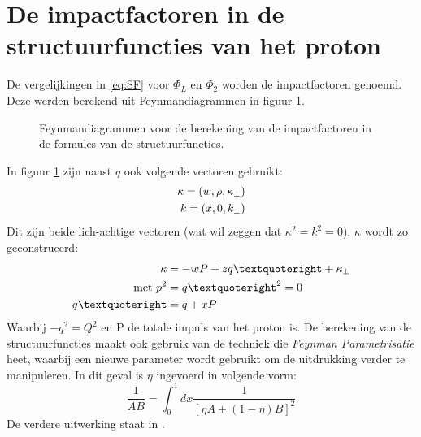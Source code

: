 \documentclass[a4paper,11pt]{article}
\numberwithin{equation}{section} %
\begin{document}
\section{De impactfactoren in de structuurfuncties van het proton} \label{app:ImpactFactors}
De vergelijkingen in \eqref{eq:SF} voor $\Phi_L$ en $\Phi_2$ worden de impactfactoren genoemd.
Deze werden berekend uit Feynmandiagrammen in figuur \ref{fig:FeynmanImpactFactors}.
\begin{figure} [H]
\centering
{}
\caption{Feynmandiagrammen voor de berekening van de impactfactoren in de formules van de structuurfuncties.}
\label{fig:FeynmanImpactFactors}
\end{figure}
In figuur \ref{fig:FeynmanImpactFactors} zijn naast $q$ ook volgende vectoren gebruikt:
\begin{align}
\kappa = (w, \rho, \kappa_\perp) \notag \\
k = (x,0,k_\perp) \notag
\end{align}
Dit zijn beide lich-achtige vectoren (wat wil zeggen dat $\kappa^2 = k^2 = 0$).
$\kappa$ wordt zo geconstrueerd:
\begin{align}
\kappa &= -wP + z q’ + \kappa_\perp \\
\text{met } p^2 &= q’^2 = 0 \notag \\
q’ &= q + xP
\end{align}
Waarbij $-q^2 = Q^2$ en P de totale impuls van het proton is.
De berekening van de structuurfuncties maakt ook gebruik van de techniek die \textit{Feynman Parametrisatie} heet, waarbij een nieuwe parameter wordt gebruikt om de uitdrukking verder te manipuleren.
In dit geval is $\eta$ ingevoerd in volgende vorm:
\begin{equation}
\frac{1}{AB} = \int_0^1 dx \frac{1}{\left[\eta A+(1-\eta)B \right]^2}
\end{equation}
De verdere uitwerking staat in \cite{Barone}.
\end{document}
